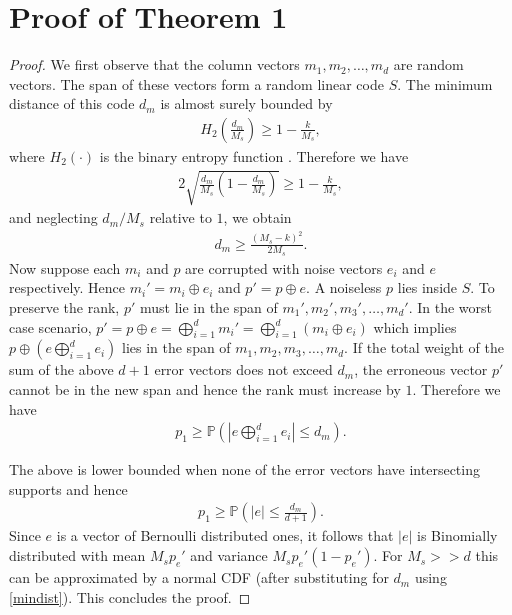 \documentclass[conference]{IEEEtran}
\begin{document}
\section{Proof of Theorem 1}
\begin{proof}
    We first observe that the column vectors $m_1, m_2, \ldots, m_d$ are random vectors. The span of these vectors form a random linear code $S$. The minimum distance of this code $d_m$ is almost surely bounded by 
    \begin{align*}
        H_2\left(\frac{d_m}{M_s}\right) \geq 1 - \frac{k}{M_s},
    \end{align*}
    where $H_2(\cdot)$ is the binary entropy function \cite{barg}. Therefore we have 
    \begin{align*}
        2\sqrt{\frac{d_m}{M_s}\left(1-\frac{d_m}{M_s}\right)} \geq 1 - \frac{k}{M_s},
    \end{align*} and neglecting $d_m/M_s$ relative to $1$, we obtain 
    \begin{align}\label{mindist}
        d_m \geq \frac{(M_s-k)^2}{2M_s}.
    \end{align}
    Now suppose each $m_i$ and $p$ are corrupted with noise vectors $e_i$ and $e$ respectively. Hence $m_i' = m_i \oplus e_i$ and $p' = p \oplus e$. A noiseless $p$ lies inside $S$. To preserve the rank, $p'$ must lie in the span of $m_1', m_2', m_3', \ldots, m_d'$. In the worst case scenario, $p' = p \oplus e = \bigoplus_{i=1}^d m_i' = \bigoplus_{i=1}^d (m_i \oplus e_i)$ which implies $p \oplus (e \bigoplus_{i=1}^d e_i)$ lies in the span of $m_1, m_2, m_3, \ldots, m_d$. If the total weight of the sum of the above $d+1$ error vectors does not exceed $d_m$, the erroneous vector $p'$ cannot be in the new span and hence the rank must increase by $1$. Therefore we have
    \begin{align*}
        p_1 \geq \mathbb{P}\left(\left|e \bigoplus_{i=1}^d e_i\right| \leq d_m \right).
    \end{align*} 
 
 The above is lower bounded when none of the error vectors have intersecting supports and hence
 \begin{align*}
        p_1 \geq \mathbb{P}\left(|e| \leq \frac{d_m}{d+1} \right).
    \end{align*}  
    Since $e$ is a vector of Bernoulli distributed ones, it follows that $|e|$ is Binomially distributed with mean $M_s p_e'$ and variance $M_sp_e'(1-p_e')$. For $M_s >> d$ this can be approximated by a normal CDF (after substituting for $d_m$ using \eqref{mindist}). This concludes the proof.
\end{proof}
\end{document}
